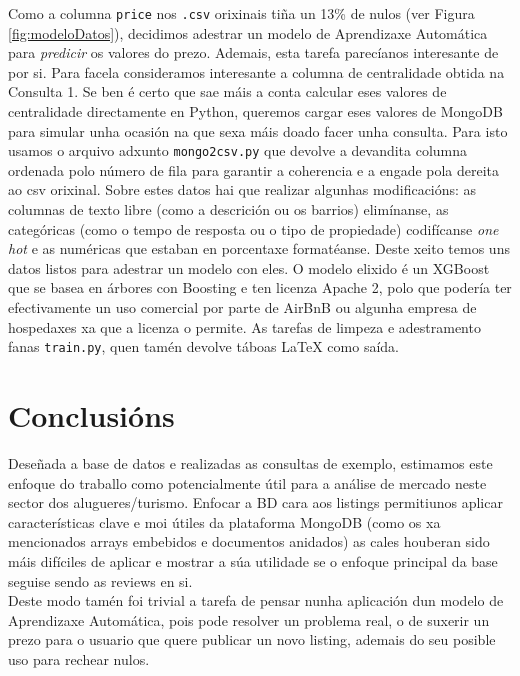 \documentclass[12pt,a4paper]{article}
\begin{document}
Como a columna \texttt{price} nos \texttt{.csv} orixinais tiña un 13\% de nulos
(ver Figura \ref{fig:modeloDatos}), decidimos adestrar un modelo de Aprendizaxe
Automática para \emph{predicir} os valores do prezo. Ademais, esta tarefa
parecíanos interesante de por si. Para facela consideramos interesante a columna
de centralidade obtida na Consulta 1. Se ben é certo que sae máis a conta
calcular eses valores de centralidade directamente en Python, queremos cargar
eses valores de MongoDB para simular unha ocasión na que sexa máis doado facer
unha consulta. Para isto usamos o arquivo adxunto \texttt{mongo2csv.py} que
devolve a devandita columna ordenada polo número de fila para garantir a
coherencia e a engade pola dereita ao csv orixinal. Sobre estes datos hai que
realizar algunhas modificacións: as columnas de texto libre (como a descrición
ou os barrios) elimínanse, as categóricas (como o tempo de resposta ou o tipo de
propiedade) codifícanse \emph{one hot} e as numéricas que estaban en porcentaxe
formatéanse. Deste xeito temos uns datos listos para adestrar un modelo con
eles. O modelo elixido é un XGBoost que se basea en árbores con Boosting e ten
licenza Apache 2, polo que podería ter efectivamente un uso comercial por parte
de AirBnB ou algunha empresa de hospedaxes xa que a licenza o permite. As tarefas
de limpeza e adestramento fanas \texttt{train.py}, quen tamén devolve táboas
\LaTeX{} como saída.






\section{Conclusións}
Deseñada a base de datos e realizadas as consultas de exemplo, estimamos este
enfoque do traballo como potencialmente útil para a análise de mercado neste
sector dos alugueres/turismo. Enfocar a BD cara aos listings permitiunos
aplicar características clave e moi útiles da plataforma MongoDB (como os xa
mencionados arrays embebidos e documentos anidados) as cales houberan sido máis
difíciles de aplicar e mostrar a súa utilidade se o enfoque principal da base
seguise sendo as reviews en si. \\

Deste modo tamén foi trivial a tarefa de pensar nunha aplicación dun modelo de
Aprendizaxe Automática, pois pode resolver un problema real, o de suxerir un
prezo para o usuario que quere publicar un novo listing, ademais do seu posible
uso para rechear nulos. \\
\end{document}
